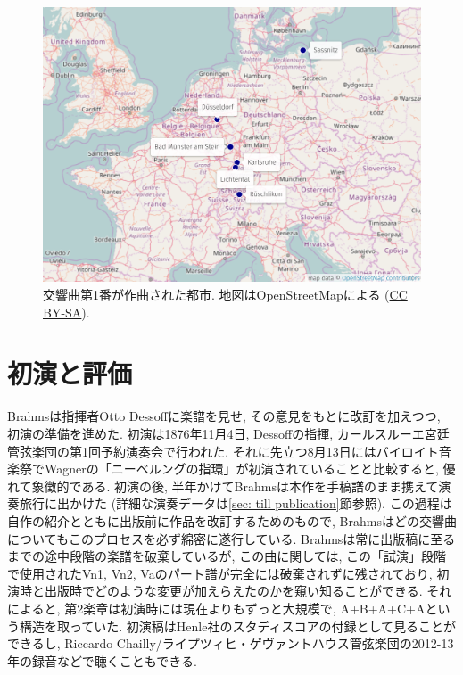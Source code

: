 \begin{figure}[htbp]
	\begin{center}
    \includegraphics[clip,width=12.0cm]{./figure/map-composition.png}
	\caption{交響曲第1番が作曲された都市.
		地図はOpenStreetMapによる (\href{http://www.openstreetmap.org/copyright}{CC BY-SA}).}
    \label{fig: concert}
	\end{center}
\end{figure}


\section{初演と評価}\label{sec: premiere}

Brahmsは指揮者Otto Dessoffに楽譜を見せ, その意見をもとに改訂を加えつつ, 初演の準備を進めた.
初演は1876年11月4日, Dessoffの指揮, カールスルーエ宮廷管弦楽団の第1回予約演奏会で行われた.
それに先立つ8月13日にはバイロイト音楽祭でWagnerの「ニーベルングの指環」が初演されていることと比較すると, 優れて象徴的である.
初演の後, 半年かけてBrahmsは本作を手稿譜のまま携えて演奏旅行に出かけた (詳細な演奏データは\ref{sec: till publication}節参照).
この過程は自作の紹介とともに出版前に作品を改訂するためのもので, Brahmsはどの交響曲についてもこのプロセスを必ず綿密に遂行している.
Brahmsは常に出版稿に至るまでの途中段階の楽譜を破棄しているが, この曲に関しては,
この「試演」段階で使用されたVn1, Vn2, Vaのパート譜が完全には破棄されずに残されており, 初演時と出版時でどのような変更が加えらえたのかを窺い知ることができる.
それによると, 第2楽章は初演時には現在よりもずっと大規模で, A+B+A+C+Aという構造を取っていた.
初演稿はHenle社のスタディスコアの付録として見ることができる\cite{henle}し, Riccardo Chailly/ライプツィヒ・ゲヴァントハウス管弦楽団の2012-13年の録音などで聴くこともできる.

